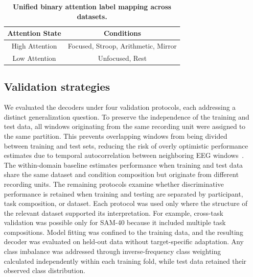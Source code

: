\documentclass[10pt,letterpaper]{article}
\newcommand{\rev}[1]{#1}
\newcommand{\revs}[1]{#1}
\begin{document}
\begin{table}[!ht]
\centering
\caption{\textbf{Unified binary attention label mapping across datasets.}}
\label{tab:attention_label_mapping}
\begin{tabular}{|c|c|}
\hline
\textbf{Attention State} & \textbf{Conditions} \\
\hline
High Attention & Focused, Stroop, Arithmetic, Mirror \\
Low Attention  & Unfocused, Rest \\
\hline
\end{tabular}
\end{table}

\subsection*{\revs{Validation strategies}}

\rev{We evaluated the decoders under four validation protocols, each addressing a distinct generalization question. To preserve the independence of the training and test data, all windows originating from the same recording unit were assigned to the same partition. This prevents overlapping windows from being divided between training and test sets, reducing the risk of overly optimistic performance estimates due to temporal autocorrelation between neighboring EEG windows~\cite{chen2025hybrid}. The within-domain baseline estimates performance when training and test data share the same dataset and condition composition but originate from different recording units. The remaining protocols examine whether discriminative performance is retained when training and testing are separated by participant, task composition, or dataset. Each protocol was used only where the structure of the relevant dataset supported its interpretation. For example, cross-task validation was possible only for SAM-40 because it included multiple task compositions. Model fitting was confined to the training data, and the resulting decoder was evaluated on held-out data without target-specific adaptation. Any class imbalance was addressed through inverse-frequency class weighting calculated independently within each training fold, while test data retained their observed class distribution.}
\end{document}
